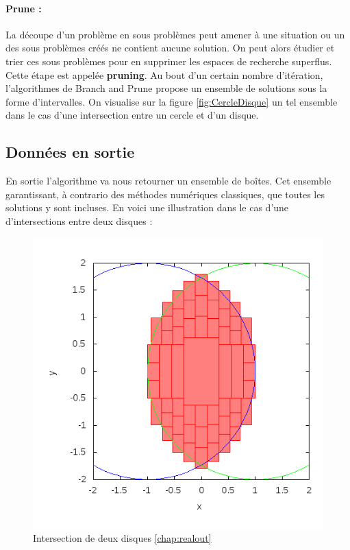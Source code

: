 \paragraph{Prune :}
La découpe d'un problème en sous problèmes peut amener à une situation ou un des sous problèmes créés ne contient aucune solution. On peut alors étudier et trier ces sous problèmes pour en supprimer les espaces de recherche superflus. Cette étape est appelée \textbf{pruning}.
Au bout d'un certain nombre d'itération, l'algorithmes de Branch and Prune propose un ensemble de solutions sous la forme d'intervalles. On visualise sur la figure \ref{fig:CercleDisque} un tel ensemble dans le cas d'une intersection entre un cercle et d'un disque.





\subsection{Données en sortie}
En sortie l'algorithme va nous retourner un ensemble de boîtes. Cet ensemble garantissant, à contrario des méthodes numériques classiques, que toutes les solutions y sont incluses. En voici une illustration dans le cas d'une d'intersections entre deux disques : 
\begin{figure}[h] %
  \center
\includegraphics[scale=0.50]{img/disk-disk}
  \caption{Intersection de deux disques \ref{chap:realout}} %
 \label{fig:DisqueDisque} %
\end{figure} %

